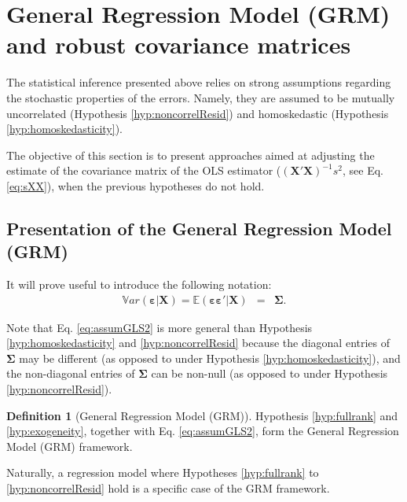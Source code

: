 \documentclass[
  12pt,
]{book}
\theoremstyle{definition}
\newtheorem{definition}{Definition}[chapter]
\theoremstyle{definition}
\theoremstyle{definition}
\theoremstyle{definition}
\theoremstyle{remark}
\begin{document}
\hypertarget{general-regression-model-grm-and-robust-covariance-matrices}{%
\section{General Regression Model (GRM) and robust covariance matrices}\label{general-regression-model-grm-and-robust-covariance-matrices}}

The statistical inference presented above relies on strong assumptions regarding the stochastic properties of the errors. Namely, they are assumed to be mutually uncorrelated (Hypothesis \ref{hyp:noncorrelResid}) and homoskedastic (Hypothesis \ref{hyp:homoskedasticity}).

The objective of this section is to present approaches aimed at adjusting the estimate of the covariance matrix of the OLS estimator (\((\mathbf{X}'\mathbf{X})^{-1}s^2\), see Eq. \eqref{eq:sXX}), when the previous hypotheses do not hold.

\hypertarget{presentation-of-the-general-regression-model-grm}{%
\subsection{Presentation of the General Regression Model (GRM)}\label{presentation-of-the-general-regression-model-grm}}

It will prove useful to introduce the following notation:
\begin{eqnarray}
\mathbb{V}ar(\boldsymbol\varepsilon | \mathbf{X}) = \mathbb{E}(\boldsymbol\varepsilon \boldsymbol\varepsilon'| \mathbf{X}) &=& \boldsymbol\Sigma. \label{eq:assumGLS2}
\end{eqnarray}

Note that Eq. \eqref{eq:assumGLS2} is more general than Hypothesis \ref{hyp:homoskedasticity} and \ref{hyp:noncorrelResid} because the diagonal entries of \(\boldsymbol\Sigma\) may be different (as opposed to under Hypothesis \ref{hyp:homoskedasticity}), and the non-diagonal entries of \(\boldsymbol\Sigma\) can be non-null (as opposed to under Hypothesis \ref{hyp:noncorrelResid}).

\begin{definition}[General Regression Model (GRM)]
\protect\hypertarget{def:GRM}{}\label{def:GRM}Hypothesis \ref{hyp:fullrank} and \ref{hyp:exogeneity}, together with Eq. \eqref{eq:assumGLS2}, form the General Regression Model (GRM) framework.
\end{definition}

Naturally, a regression model where Hypotheses \ref{hyp:fullrank} to \ref{hyp:noncorrelResid} hold is a specific case of the GRM framework.
\end{document}
